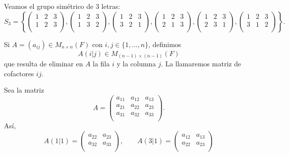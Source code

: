 \documentclass[12pt,a4paper]{book}
\newcommand{\llaves}[1]{\{#1\}}
\newcommand{\llavesgrandes}[1]{\left\{#1\right\}}
\begin{document}
    \begin{ejemplo}
        Veamos el grupo simétrico de 3 letras:
        \[
        S_3 = \llavesgrandes{\begin{pmatrix}
            1 & 2 & 3 \\
            1 & 2 & 3 \\
        \end{pmatrix}, \begin{pmatrix}
            1 & 2 & 3 \\
            1 & 3 & 2 \\
        \end{pmatrix}, \begin{pmatrix}
            1 & 2 & 3 \\
            3 & 2 & 1 \\
        \end{pmatrix}, \begin{pmatrix}
            1 & 2 & 3 \\
            2 & 1 & 3 \\
        \end{pmatrix}, \begin{pmatrix}
            1 & 2 & 3 \\
            2 & 3 & 1 \\
        \end{pmatrix}, \begin{pmatrix}
            1 & 2 & 3 \\
            3 & 1 & 2 \\
        \end{pmatrix}
        }.
        \]
    \end{ejemplo}

    \begin{definicion}
        Si $A = (a_{ij}) \in M_{n \times n}(F)$ con $i,j \in \llaves{1, \dots, n}$, definimos
        \[
        A(i | j) \in M_{(n - 1) \times (n - 1)}(F)
        \]
        que resulta de eliminar en $A$ la fila $i$ y la columna $j$. La llamaremos matriz de cofactores $ij$.
    \end{definicion}
    \begin{ejemplo}
        Sea la matriz
        \[
        A = \begin{pmatrix}
            a_{11} & a_{12} & a_{13}\\
            a_{21} & a_{22} & a_{23}\\
            a_{31} & a_{32} & a_{33}\\
        \end{pmatrix}.
        \]
        Así,
        \[
        A(1 | 1) = \begin{pmatrix}
            a_{22} & a_{23}\\
            a_{32} & a_{33}\\
        \end{pmatrix}, \qquad A(3 | 1) = \begin{pmatrix}
            a_{12} & a_{13}\\
            a_{22} & a_{23}\\
        \end{pmatrix}        
        \]
    \end{ejemplo}
\end{document}
